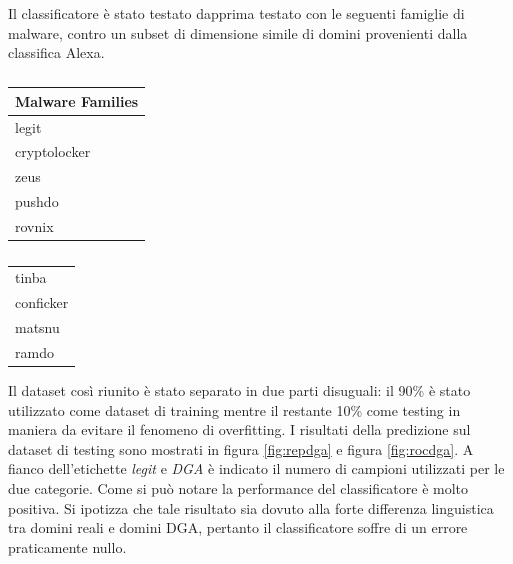 Il classificatore è stato testato dapprima testato con le seguenti famiglie di malware, contro un subset di dimensione simile di domini provenienti dalla classifica Alexa.

\begin{table}[!bp]
    \centering
    \begin{tabular}[t]{l}
    \toprule
    Malware Families \\
    \midrule
legit \\
cryptolocker \\
zeus \\
pushdo \\
rovnix \\
\bottomrule
\end{tabular}
 \begin{tabular}[t]{l}
    \toprule
tinba \\
conficker \\
matsnu \\
ramdo \\
\bottomrule
\end{tabular}
\caption{\label{tab:malware}}
\end{table}

Il dataset così riunito è stato separato in due parti disuguali: il 90\% è stato utilizzato come dataset di training mentre il restante 10\% come testing in maniera da evitare il fenomeno di overfitting. I risultati della predizione sul dataset di testing sono mostrati in figura \ref{fig:repdga} e figura \ref{fig:rocdga}. A fianco dell'etichette \textit{legit} e \textit{DGA} è indicato il numero di campioni utilizzati per le due categorie. Come si può notare la performance del classificatore è molto positiva. Si ipotizza che tale risultato sia dovuto alla forte differenza linguistica tra domini reali e domini DGA, pertanto il classificatore soffre di un errore praticamente nullo. 

